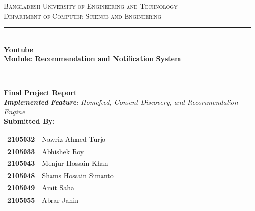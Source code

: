 \documentclass[11pt, a4paper]{report}
\begin{document}
\begin{titlepage}
    \centering
    \vspace*{0.5cm}
    
    
    {\Large \textsc{Bangladesh University of Engineering and Technology}}\\[0.3cm]
    {\large \textsc{Department of Computer Science and Engineering}}\\[1.5cm]
    
    {\color{primary} \rule{\linewidth}{1mm}} \\[0.6cm]
    {\Huge \textbf{\color{primary} Youtube}}\\[0.5cm]
    {\Large \textbf{Module: Recommendation and Notification System}}\\[0.4cm]
    {\color{primary} \rule{\linewidth}{1mm}} \\[1.5cm]
    
    {\Large \textbf{Final Project Report}}\\[0.5cm]
    {\large \textit{\textbf{Implemented Feature:} Homefeed, Content Discovery, and Recommendation Engine}}\\[2cm]
    
    {\Large \textbf{Submitted By:}}\\[0.5cm]
    \begin{table}[h]
        \centering
        \Large %
        \renewcommand{\arraystretch}{1.3}
        \begin{tabular}{rl}
            \textbf{2105032} & Nawriz Ahmed Turjo \\
            \textbf{2105033} & Abhishek Roy \\
            \textbf{2105043} & Monjur Hossain Khan \\
            \textbf{2105048} & Shams Hossain Simanto \\
            \textbf{2105049} & Amit Saha \\
            \textbf{2105055} & Abrar Jahin \\
        \end{tabular}
    \end{table}
    

\end{titlepage}
\end{document}
